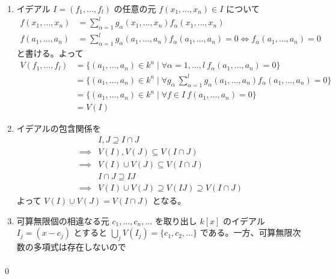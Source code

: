 \documentclass[uplatex,dvipdfmx,a4paper,11pt]{jlreq}
\makeatletter
\numberwithin{equation}{section}
\theoremstyle{definition}
\renewenvironment{proof}[1][\proofname]{\par
  \normalfont
  \topsep6\p@\@plus6\p@ \trivlist
  \item[\hskip\labelsep{\bfseries #1}\@addpunct{\bfseries}]\ignorespaces\quad\par
}{%
  \qed\endtrivlist\@endpefalse
}
\renewcommand\proofname{証明}
\makeatother
\begin{document}
\begin{proof}
  \begin{enumerate}
    \item イデアル $I = (f_1,\ldots,f_l)$ の任意の元 $f(x_1,\ldots,x_n)\in I$ について
          \begin{align}
            f(x_1,\ldots,x_n) & = \sum_{\alpha=1}^{l}g_\alpha(x_1,\ldots,x_n)f_\alpha(x_1,\ldots,x_n)                                       \\
            f(a_1,\ldots,a_n) & = \sum_{\alpha=1}^{l}g_\alpha(a_1,\ldots,a_n)f_\alpha(a_1,\ldots,a_n) = 0 \iff f_\alpha(a_1,\ldots,a_n) = 0
          \end{align}
          と書ける。よって
          \begin{align}
            V(f_1, \ldots, f_l) & = \lbrace(a_1, \ldots, a_n)\in k^n\mid \forall \alpha = 1,\ldots,l \ f_\alpha(a_1,\ldots,a_n) = 0\rbrace                                 \\
                                & = \lbrace(a_1, \ldots, a_n)\in k^n\mid \forall g_\alpha \ \sum_{\alpha=1}^{l}g_\alpha(a_1,\ldots,a_n)f_\alpha(a_1,\ldots,a_n) = 0\rbrace \\
                                & = \lbrace(a_1, \ldots, a_n)\in k^n\mid \forall f\in I \ f(a_1,\ldots,a_n) = 0\rbrace                                                     \\
                                & = V(I)
          \end{align}
    \item イデアルの包含関係を
          \begin{align}
                     & I,J \supseteq I\cap J                            \\
            \implies & V(I), V(J)\subseteq V(I\cap J)                   \\
            \implies & V(I) \cup V(J) \subseteq V(I\cap J)              \\
                     & I\cap J\supseteq IJ                              \\
            \implies & V(I)\cup V(J)\supseteq V(IJ)\supseteq V(I\cap J)
          \end{align}
          よって $V(I) \cup V(J) = V(I\cap J)$ となる。
    \item 可算無限個の相違なる元 $c_1,\ldots,c_n,\ldots$ を取り出し $k[x]$ のイデアル $I_j = (x - c_j)$ とすると $\bigcup_j V(I_j) = \lbrace c_1, c_2, \ldots \rbrace$ である。一方、可算無限次数の多項式は存在しないので
          \begin{align}

\end{align}
\end{enumerate}
\end{proof}
\end{document}
